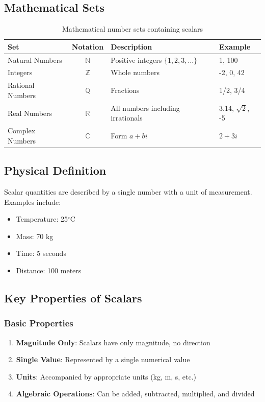\documentclass[11pt,a4paper]{article}
\begin{document}
\subsection{Mathematical Sets}

\begin{table}[h]
\centering
\begin{tabular}{|l|c|l|l|}
\hline
\textbf{Set} & \textbf{Notation} & \textbf{Description} & \textbf{Example} \\ \hline
Natural Numbers & $\mathbb{N}$ & Positive integers $\{1, 2, 3, \ldots\}$ & 1, 100 \\ \hline
Integers & $\mathbb{Z}$ & Whole numbers & -2, 0, 42 \\ \hline
Rational Numbers & $\mathbb{Q}$ & Fractions & 1/2, 3/4 \\ \hline
Real Numbers & $\mathbb{R}$ & All numbers including irrationals & 3.14, $\sqrt{2}$, -5 \\ \hline
Complex Numbers & $\mathbb{C}$ & Form $a + bi$ & $2 + 3i$ \\ \hline
\end{tabular}
\caption{Mathematical number sets containing scalars}
\end{table}

\subsection{Physical Definition}

Scalar quantities are described by a single number with a unit of measurement. Examples include:
\begin{itemize}
    \item Temperature: 25$^\circ$C
    \item Mass: 70 kg
    \item Time: 5 seconds
    \item Distance: 100 meters
\end{itemize}

\subsection{Key Properties of Scalars}

\subsubsection{Basic Properties}

\begin{enumerate}
    \item \textbf{Magnitude Only}: Scalars have only magnitude, no direction
    \item \textbf{Single Value}: Represented by a single numerical value
    \item \textbf{Units}: Accompanied by appropriate units (kg, m, s, etc.)
    \item \textbf{Algebraic Operations}: Can be added, subtracted, multiplied, and divided
\end{enumerate}
\end{document}
